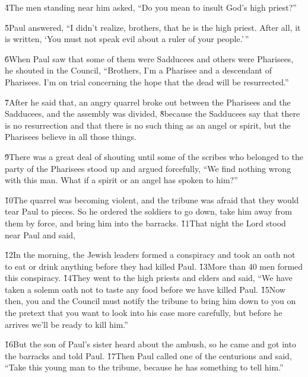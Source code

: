\v{4}The men standing near him asked, ``Do you mean to insult God's high priest?''

\v{5}Paul answered, ``I didn't realize, brothers, that he is the high priest. After all, it is written, `You must not speak evil about a ruler of your people.'\,''

\v{6}When Paul saw that some of them were Sadducees and others were Pharisees, he shouted in the Council, ``Brothers, I'm a Pharisee and a descendant of Pharisees. I'm on trial concerning the hope that the dead will be resurrected.''

\v{7}After he said that, an angry quarrel broke out between the Pharisees and the Sadducees, and the assembly was divided, \v{8}because the Sadducees say that there is no resurrection and that there is no such thing as an angel or spirit, but the Pharisees believe in all those things.

\v{9}There was a great deal of shouting until some of the scribes who belonged to the party of the Pharisees stood up and argued forcefully, ``We find nothing wrong with this man. What if a spirit or an angel has spoken to him?''

\v{10}The quarrel was becoming violent, and the tribune was afraid that they would tear Paul to pieces. So he ordered the soldiers to go down, take him away from them by force, and bring him into the barracks. \v{11}That night the Lord stood near Paul and said, 

\v{12}In the morning, the Jewish leaders formed a conspiracy and took an oath not to eat or drink anything before they had killed Paul. \v{13}More than 40 men formed this conspiracy. \v{14}They went to the high priests and elders and said, ``We have taken a solemn oath not to taste any food before we have killed Paul. \v{15}Now then, you and the Council must notify the tribune to bring him down to you on the pretext that you want to look into his case more carefully, but before he arrives we'll be ready to kill him.''

\v{16}But the son of Paul's sister heard about the ambush, so he came and got into the barracks and told Paul. \v{17}Then Paul called one of the centurions and said, ``Take this young man to the tribune, because he has something to tell him.''

